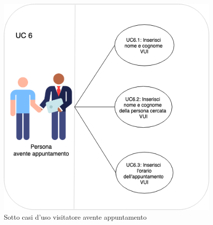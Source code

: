 \begin{figure}[H] 
    \centering 
    \includegraphics[width=0.7\columnwidth]{immagini/casi_duso2.png}
    \caption{\label{fig:sotto_casi_duso_visitatori1}Sotto casi d'uso visitatore avente appuntamento}
\end{figure}
